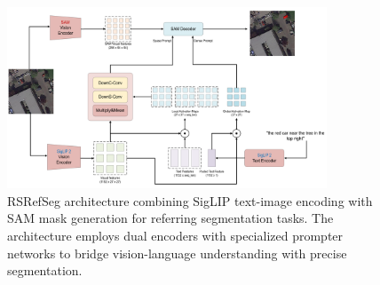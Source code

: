 \begin{figure}[t]
\centering
\includegraphics[width=0.85\textwidth]{./images/rsrefseg.png}
\caption{RSRefSeg architecture combining SigLIP text-image encoding with SAM mask generation for referring segmentation tasks. The architecture employs dual encoders with specialized prompter networks to bridge vision-language understanding with precise segmentation.}
\label{fig:rsrefseg_architecture}
\end{figure}

